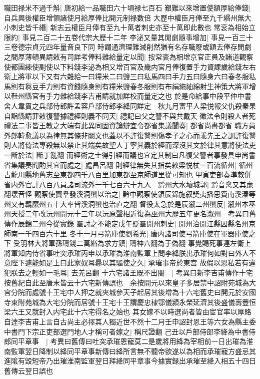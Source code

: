 職田禄米不過千斛|{
	唐初給一品職田六十頃禄七百石}
艱難以來增置使額厚給俸錢|{
	自兵興後權臣增領諸使月給厚俸比開元制禄數倍}
大歷中權臣月俸至九千緡州無大小刺史皆千緡|{
	新志云權臣月俸有至九十萬者刺史亦至十萬即此數也}
常衮為相始立限約|{
	事見二百二十五卷代宗大歷十二年}
李泌又量其閒劇隨事增加|{
	事見一百三十三卷德宗貞元四年量音良下同}
時謂通濟理難減削然猶有名存職廢或額去俸存閒劇之間厚薄頓異請敕有司詳考俸料雜給量定以聞|{
	按常衮為相增京官正員及諸道觀察使都團練使副使以下料錢李泌為相又增百官及畿内官月俸復置手力資課歲給錢左右衛上將軍以下又有六雜給一曰糧米二曰鹽三曰私馬四曰手力五曰隨身六曰春冬服私馬則有芻豆手力則有資錢隨身則有糧米鹽春冬服則有布絹絁紬綿射生神策大將軍增以鞋州縣官有手力雜給錢李吉甫請就加詳校而量定之也}
於是命給事中段平仲中書舍人韋貫之兵部侍郎許孟容戶部侍郎李絳同詳定　秋九月富平人梁悦報父仇殺秦杲自詣縣請罪敕復讐據禮經則義不同天|{
	禮記曰父之讐不與共戴天}
徵法令則殺人者死禮法二事皆王教之大端有此異同固資論辯宜令都省集議聞奏|{
	都省尚書都省}
職方員外郎韓愈議以為律無其條非闕文也蓋以不許復讐則傷孝子之心而乖先王之訓許復讐則人將倚法專殺無以禁止其端矣故聖人丁寧其義於經而深沒其文於律其意將使法吏一斷於法|{
	斷丁亂翻}
而經術之士得引經而議也宜定其制曰凡復父讐者事發具申尚書省集議奏聞酌其宜而處之|{
	處昌呂翻}
則經律無失其指矣敕梁悦杖一百流循州|{
	循州古龍川縣地舊志至東都四千八百里加東都至京師道里從可知也}
甲寅吏部奏凖敕併省内外官計八百八員諸司流外一千七百六十九人　黔州大水壞城郭|{
	黔音禽又其亷翻壞音怪}
觀察使竇羣發溪洞蠻以治之|{
	黔中觀察使領辰錦施叙奬夷播思費南溪溱等州又有羈縻州五十大率皆溪洞蠻也治直之翻}
督役太急於是辰溆二州蠻反|{
	溆州本巫州天授二年改沅州開元十三年以沅原聲相近復為巫州大歷五年更名溆州　考異曰舊傳作辰錦二州今從實錄}
羣討之不能定戊午貶羣開州刺史|{
	開州治開江縣因縣名州京師南一千四百六十里}
冬十一月弓箭庫使劉希光|{
	唐内諸司使弓箭庫使在軍器庫使之下}
受羽林大將軍孫璹錢二萬緡為求方鎮|{
	璹神六翻為于偽翻}
事覺賜死事連左衛上將軍知内侍省事吐突承璀丙申以承璀為淮南監軍上問李絳朕出承璀何如對曰外人不意陛下遽能如是上曰此家奴耳曏以其驅使之久|{
	承璀事帝於東宫}
故假以恩私若有違犯朕去之輕如一毛耳|{
	去羌呂翻}
十六宅諸王既不出閤　|{
	考異曰新李吉甫傳作十宅按舊紀自此至唐末皆云十六宅新傳誤也　余按開元以來皇子多居禁中詔附苑城為大宫分院而處號十王宅中人押之就夾城參天子起居其後增為十六宅舊史曰開元於安國寺東附苑城為大宅分院而居號十王宅十王謂慶忠棣鄂儀潁永榮延濟其後盛儀壽豐恒梁六王又就封入内宅此十六宅得名之始也}
其女嫁不以時選尚者皆由宦官率以厚賂自逹李吉甫上言自古尚主必擇其人獨近世不然十二月壬申詔封恩王等六女為縣主委中書門下宗正吏部選門地人才稱可者嫁之|{
	稱尺證翻}
己丑以戶部侍郎李絳為中書侍郎同平章事　|{
	考異曰舊傳曰吐突承璀恩寵莫二是歲將用絳為宰相前一日出璀為淮南監軍翌日降制以絳同平章事新傳曰絳所言無不聽帝欲遂以為相而承璀寵方盛忌其進隂有毀短帝乃出璀淮南監軍翌日拜絳同平章事今據實録出承璀至絳入相五十四日舊傳云翌日誤也}

